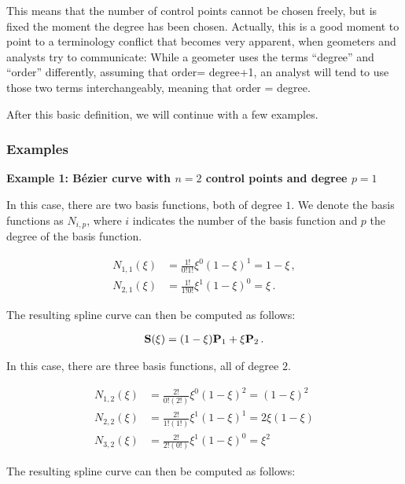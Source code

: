 \documentclass[11pt,a4paper]{article}
\begin{document}
This means that the number of control points cannot be chosen freely, but is fixed the moment the degree has been chosen. Actually, this is a good moment to point to a terminology conflict that becomes very apparent, when geometers and analysts try to communicate: While a geometer uses the terms ``degree'' and ``order'' differently, assuming that order= degree+1, an analyst will tend to use those two terms interchangeably, meaning that order = degree.

After this basic definition, we will continue with a few examples.




\subsubsection{Examples}

{\bf{Example 1: Bézier curve with $n=2$ control points and degree $p=1$}}
	
 In this case, there are two basis functions, both of degree $1$. We denote the basis functions as $N_{i,p}$, where $i$ indicates the number of the basis function and $p$ the degree of the basis function. 

	\begin{align}
		N_{1,1}(\xi)&=\frac{1!}{0!1!}\xi^{0}(1-\xi)^{1}=1-\xi \,,\\
		N_{2,1}(\xi)&=\frac{1!}{1!0!}\xi^{1}(1-\xi)^{0}=\xi \,.
	\end{align}
	
\noindent The resulting spline curve can then be computed as follows:

\begin{align}
	{\bf S}(\xi)=(1-\xi){\bf P}_{1}+\xi {\bf P}_{2} \,.
\end{align}



\noindent In this case, there are three basis functions, all of degree $2$. 

	\begin{align*}
		N_{1,2}(\xi)&=\frac{2!}{0!(2!)}\xi^{0}(1-\xi)^{2}=(1-\xi)^{2} \\
		N_{2,2}(\xi)&=\frac{2!}{1!(1!)}\xi^{1}(1-\xi)^{1}=2\xi (1-\xi) \\
		N_{3,2}(\xi)&=\frac{2!}{2!(0!)}\xi^{1}(1-\xi)^{0}=\xi^{2}
	\end{align*}

\noindent The resulting spline curve can then be computed as follows:
\end{document}

